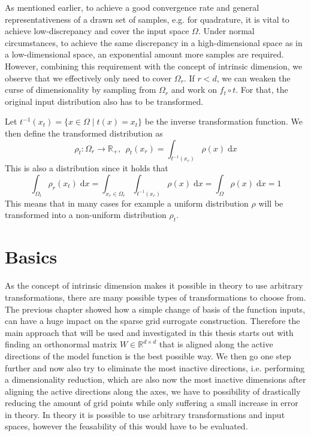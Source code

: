 \documentclass[
  a4paper,  %
  twoside,  %
  bibliography=totoc,
  headsepline,
  cleardoublepage=empty,
  parskip=half,
  draft=false
]{scrbook}
\begin{document}
As mentioned earlier, to achieve a good convergence rate and general representativeness of a drawn set of samples, e.g. for quadrature, it is vital to achieve low-discrepancy and cover the input space $\Omega$.
Under normal circumstances, to achieve the same discrepancy in a high-dimensional space as in a low-dimensional space,
an exponential amount more samples are required.
However, combining this requirement with the concept of intrinsic dimension, we observe that we effectively only need to cover $\Omega_r$.
If $r < d$, we can weaken the curse of dimensionality by sampling from $\Omega_r$ and work on $f_t \circ t$.
For that, the original input distribution also has to be transformed.
\begin{definition}
Let $t^{-1}(x_{t})=\{x \in \Omega \mid t(x)=x_{t}\}$ be the inverse transformation function.
We then define the transformed distribution as
\begin{equation}
\rho_t \colon \Omega_r \to \mathds{R_+}, ~~ \rho_t(x_r)=\int_{t^{-1}(x_r)} \rho(x) \; \text{d}x 
\end{equation}
This is also a distribution since it holds that
\begin{equation}
\int_{\Omega_t} \rho_r(x_t) \; \text{d}x=\int_{x_r \in \Omega_r} \int_{t^{-1}(x_r)} \rho(x) \; \text{d}x = \int_{\Omega} \rho(x) \; \text{d}x = 1
\end{equation}
This means that in many cases for example a uniform distribution $\rho$ will be transformed into a non-uniform distribution $\rho_t$.
\end{definition}


\section{Basics}

As the concept of intrinsic dimension makes it possible in theory to use arbitrary transformations, there are many possible types of transformations to choose from.
The previous chapter showed how a simple change of basis of the function inputs, can have a huge impact on the sparse grid surrogate construction.
Therefore the main approach that will be used and investigated in this thesis starts out with finding an orthonormal matrix $W \in \mathds{R}^{d \times d}$ that is aligned along the active directions of the model function is the best possible way.
We then go one step further and now also try to eliminate the most inactive directions, i.e. performing a dimensionality reduction, which are also now the most inactive dimensions after aligning the active directions along the axes, we have to possibility of drastically reducing the amount of grid points while only suffering a small increase in error in theory.
In theory it is possible to use arbitrary transformations and input spaces, however the feasability of this would have to be evaluated.
\end{document}
